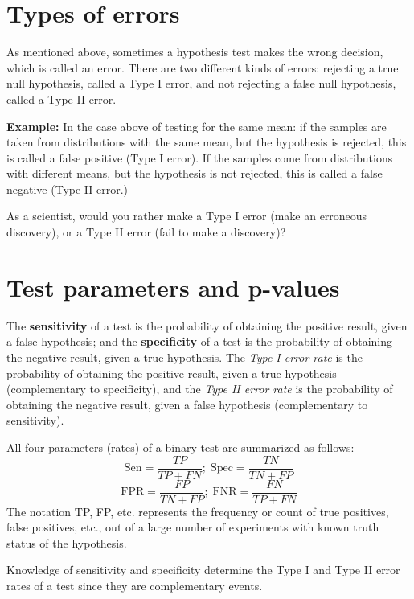 \documentclass[
  letterpaper,
  DIV=11,
  numbers=noendperiod]{scrreprt}
\begin{document}
\hypertarget{types-of-errors}{%
\section{Types of errors}\label{types-of-errors}}

As mentioned above, sometimes a hypothesis test makes the wrong
decision, which is called an error. There are two different kinds of
errors: rejecting a true null hypothesis, called a Type I error, and not
rejecting a false null hypothesis, called a Type II error.

\textbf{Example:} In the case above of testing for the same mean: if the
samples are taken from distributions with the same mean, but the
hypothesis is rejected, this is called a false positive (Type I error).
If the samples come from distributions with different means, but the
hypothesis is not rejected, this is called a false negative (Type II
error.)

As a scientist, would you rather make a Type I error (make an erroneous
discovery), or a Type II error (fail to make a discovery)?

\hypertarget{test-parameters-and-p-values}{%
\section{Test parameters and
p-values}\label{test-parameters-and-p-values}}

The \textbf{sensitivity} of a test is the probability of obtaining the
positive result, given a false hypothesis; and the \textbf{specificity}
of a test is the probability of obtaining the negative result, given a
true hypothesis. The \emph{Type I error rate} is the probability of
obtaining the positive result, given a true hypothesis (complementary to
specificity), and the \emph{Type II error rate} is the probability of
obtaining the negative result, given a false hypothesis (complementary
to sensitivity).

All four parameters (rates) of a binary test are summarized as follows:
\[\text{Sen} = \frac{TP}{TP+FN};  \; \text{Spec} = \frac{TN}{TN+FP}\]
\[\text{FPR} = \frac{FP}{TN+FP};  \; \text{FNR} = \frac{FN}{TP+FN}\] The
notation TP, FP, etc. represents the frequency or count of true
positives, false positives, etc., out of a large number of experiments
with known truth status of the hypothesis.

Knowledge of sensitivity and specificity determine the Type I and Type
II error rates of a test since they are complementary events.
\end{document}
